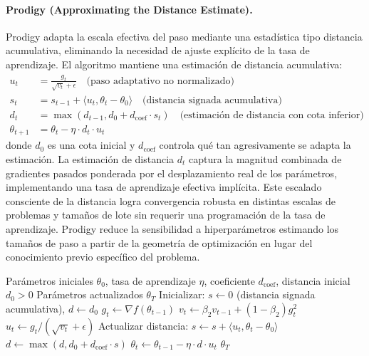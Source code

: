 \documentclass[11pt,a4paper]{article}
\begin{document}
\paragraph{Prodigy (Approximating the Distance Estimate).}
Prodigy adapta la escala efectiva del paso mediante una estadística tipo distancia acumulativa, eliminando la necesidad de ajuste explícito de la tasa de aprendizaje. El algoritmo mantiene una estimación de distancia acumulativa:
\begin{align}
u_t &= \frac{g_t}{\sqrt{v_t}+\epsilon} \quad\text{(paso adaptativo no normalizado)} \\
s_t &= s_{t-1} + \langle u_t, \theta_t - \theta_0 \rangle \quad\text{(distancia signada acumulativa)} \\
d_t &= \max(d_{t-1}, d_0 + d_{\text{coef}} \cdot s_t) \quad\text{(estimación de distancia con cota inferior)} \\
\theta_{t+1} &= \theta_t - \eta \cdot d_t \cdot u_t
\end{align}
donde $d_0$ es una cota inicial y $d_{\text{coef}}$ controla qué tan agresivamente se adapta la estimación. La estimación de distancia $d_t$ captura la magnitud combinada de gradientes pasados ponderada por el desplazamiento real de los parámetros, implementando una tasa de aprendizaje efectiva implícita. Este escalado consciente de la distancia logra convergencia robusta en distintas escalas de problemas y tamaños de lote sin requerir una programación de la tasa de aprendizaje. Prodigy reduce la sensibilidad a hiperparámetros estimando los tamaños de paso a partir de la geometría de optimización en lugar del conocimiento previo específico del problema.

\begin{algorithm}[H]
\caption{Prodigy (Approximating the Distance Estimate)}
\label{alg:prodigy}
\begin{algorithmic}[1]
\Require Parámetros iniciales $\theta_0$, tasa de aprendizaje $\eta$, coeficiente $d_{\text{coef}}$, distancia inicial $d_0 > 0$
\Ensure Parámetros actualizados $\theta_T$
\State Inicializar: $s \gets 0$ (distancia signada acumulativa), $d \gets d_0$
    \State $g_t \gets \nabla f(\theta_{t-1})$
    \State $v_t \gets \beta_2 v_{t-1} + (1-\beta_2) g_t^2$ 
    \State $u_t \gets g_t / (\sqrt{v_t} + \epsilon)$ 
    \State Actualizar distancia: $s \gets s + \langle u_t, \theta_t - \theta_0 \rangle$ 
    \State $d \gets \max(d, d_0 + d_{\text{coef}} \cdot s)$ 
    \State $\theta_t \gets \theta_{t-1} - \eta \cdot d \cdot u_t$ 
\EndFor
\Return $\theta_T$
\end{algorithmic}
\end{algorithm}
\end{document}
